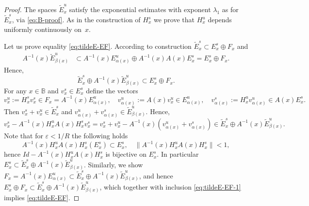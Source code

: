 \documentclass[12pt]{article}
\theoremstyle{definition}
\begin{document}
\begin{proof}
The spaces $\tilde{E}^u_x$ satisfy the exponential estimates with exponent $\lambda_1$ as for $\tilde{E}^s_x$, via \eqref{eq:B-proof}.
As in the construction of $H^s_x$ we prove that $H^u_x$ depends uniformly continuously on~$x$.

Let us prove equality \eqref{eq:tildeE-EF}.
According to construction $\tilde{E}^s_x \subset E^s_x \oplus F_x$ and
\begin{align*}
    A^{-1}(x)\tilde{E}^u_{\beta(x)} & \subset A^{-1}(x)E^u_{\alpha(x)} \oplus A^{-1}(x)A(x)E^s_x = E^s_x \oplus F_x.
\end{align*}
Hence,
\begin{equation}\label{eq:tildeE-EF-1}
    \tilde{E}^s_x \oplus A^{-1}(x)\tilde{E}^u_{\beta(x)} \subset E^s_x \oplus F_x.
\end{equation}
For any $x \in \mathbb{B}$ and $v^s_x \in E^s_x$ define the vectors 
$$
v^u_x := H^s_xv^s_x \in F_x = A^{-1}(x)E^u_{\alpha(x)}, \quad v^u_{\alpha(x)} := A(x)v^u_x \in E^u_{\alpha(x)}, \quad v^s_{\alpha(x)} := H^u_x v^u_{\alpha(x)} \in A(x)E_x^s.
$$ 
Then $v^s_x + v^u_x \in \tilde{E}^s_x$ and  $v^u_{\alpha(x)} + v^s_{\alpha(x)} \in \tilde{E}^u_{\beta(x)}$. Hence,
$$
v^s_x - A^{-1}(x) H^u_x A(x) H^s_x v^s_x = v^s_x + v^u_x - A^{-1}(x)(v^u_{\alpha(x)} + v^s_{\alpha(x)}) \in \tilde{E}^s_x \oplus A^{-1}(x)\tilde{E}^u_{\beta(x)}.
$$
Note that for $\varepsilon < 1/R$ the following holds
$$
A^{-1}(x) H^u_x A(x) H^s_x (E^s_x) \subset E^s_x, \quad \|A^{-1}(x) H^u_x A(x) H^s_x\| < 1,
$$ 
hence $Id - A^{-1}(x) H^u_x A(x) H^s_x$ is bijective on $E^s_x$. In particular
$
E^s_x \subset \tilde{E}^s_x \oplus A^{-1}(x)\tilde{E}^u_{\beta(x)}
$.
Similarly, we show
$
F_x = A^{-1}(x)E^u_{\alpha(x)} \subset \tilde{E}^s_x \oplus A^{-1}(x)\tilde{E}^u_{\beta(x)}
$,
and hence 
$
E^s_x \oplus F_x \subset \tilde{E}^s_x \oplus A^{-1}(x)\tilde{E}^u_{\beta(x)}
$,
which together with inclusion \eqref{eq:tildeE-EF-1} implies \eqref{eq:tildeE-EF}.
\end{proof}
\end{document}
